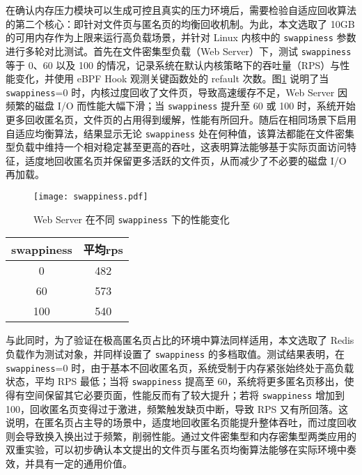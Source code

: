 在确认内存压力模块可以生成可控且真实的压力环境后，需要检验自适应回收算法的第二个核心：即针对文件页与匿名页的均衡回收机制。为此，本文选取了 10GB 的可用内存作为上限来运行高负载场景，并针对 Linux 内核中的 \texttt{swappiness} 参数进行多轮对比测试。首先在文件密集型负载（Web Server）下，测试 \texttt{swappiness} 等于 0、60 以及 100 的情况，记录系统在默认内核策略下的吞吐量（RPS）与性能变化，并使用 eBPF Hook 观测关键函数处的 refault 次数。图\ref{fig:web_server_swappiness} 说明了当 \texttt{swappiness}=0 时，内核过度回收了文件页，导致高速缓存不足，Web Server 因频繁的磁盘 I/O 而性能大幅下滑；当 \texttt{swappiness} 提升至 60 或 100 时，系统开始更多回收匿名页，文件页的占用得到缓解，性能有所回升。随后在相同场景下启用自适应均衡算法，结果显示无论 \texttt{swappiness} 处在何种值，该算法都能在文件密集型负载中维持一个相对稳定甚至更高的吞吐，这表明算法能够基于实际页面访问特征，适度地回收匿名页并保留更多活跃的文件页，从而减少了不必要的磁盘 I/O 再加载。

\begin{figure}[h]
    \centering
    \texttt{[image: swappiness.pdf]}
    \caption{Web Server 在不同 \texttt{swappiness} 下的性能变化}
    \label{fig:web_server_swappiness}
\end{figure}

    \begin{table}[h]
        \centering
        \label{tab:redis_swappiness}
        \begin{tabular}{cc}
            \toprule
            swappiness & 平均rps \\
            \midrule  
            0 & 482 \\
            60 & 573 \\
            100 & 540 \\
            \bottomrule
        \end{tabular}
    \end{table}

与此同时，为了验证在极高匿名页占比的环境中算法同样适用，本文选取了 Redis 负载作为测试对象，并同样设置了 \texttt{swappiness} 的多档取值。测试结果表明，在 \texttt{swappiness}=0 时，由于基本不回收匿名页，系统受制于内存紧张始终处于高负载状态，平均 RPS 最低；当将 \texttt{swappiness} 提高至 60，系统将更多匿名页移出，使得有空间保留其它必要页面，性能反而有了较大提升；若将 \texttt{swappiness} 增加到 100，回收匿名页变得过于激进，频繁触发缺页中断，导致 RPS 又有所回落。这说明，在匿名页占主导的场景中，适度地回收匿名页能提升整体吞吐，而过度回收则会导致换入换出过于频繁，削弱性能。通过文件密集型和内存密集型两类应用的双重实验，可以初步确认本文提出的文件页与匿名页均衡算法能够在实际环境中奏效，并具有一定的通用价值。

